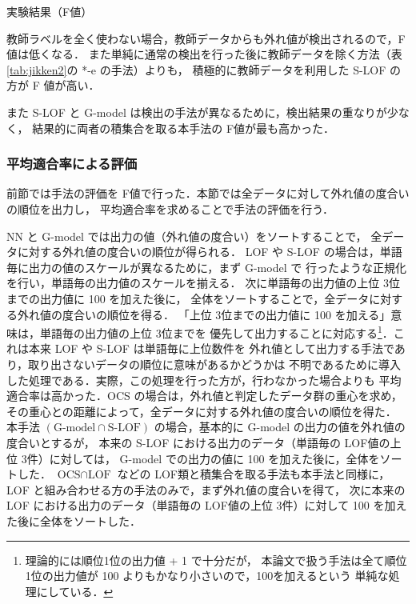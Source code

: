 \documentclass[japanese]{jnlp_1.4}
\begin{document}
\begin{table}[t]
\caption{実験結果（F値）}
\label{tab:jikken2}

\end{table}

教師ラベルを全く使わない場合，教師データからも外れ値が検出されるので，F値は低くなる．
また単純に通常の検出を行った後に教師データを除く方法（表\ref{tab:jikken2}の *-e の手法）よりも，
積極的に教師データを利用した S-LOF の方が F 値が高い．

また S-LOF と G-model は検出の手法が異なるために，検出結果の重なりが少なく，
結果的に両者の積集合を取る本手法の F値が最も高かった．

\subsubsection{平均適合率による評価} 

前節では手法の評価を F値で行った．本節では全データに対して外れ値の度合いの順位を出力し，
平均適合率を求めることで手法の評価を行う．

NN と G-model では出力の値（外れ値の度合い）をソートすることで，
全データに対する外れ値の度合いの順位が得られる．
LOF や S-LOF の場合は，単語毎に出力の値のスケールが異なるために，まず G-model で
行ったような正規化を行い，単語毎の出力値のスケールを揃える．
次に単語毎の出力値の上位 3位までの出力値に 100 を加えた後に，
全体をソートすることで，全データに対する外れ値の度合いの順位を得る．
「上位 3位までの出力値に 100 を加える」意味は，単語毎の出力値の上位 3位までを
優先して出力することに対応する\footnote{理論的には順位1位の出力値 + 1 で十分だが，
本論文で扱う手法は全て順位1位の出力値が 100 よりもかなり小さいので，100を加えるという
単純な処理にしている．}．これは本来 LOF や S-LOF は単語毎に上位数件を
外れ値として出力する手法であり，取り出さないデータの順位に意味があるかどうかは
不明であるために導入した処理である．実際，この処理を行った方が，行わなかった場合よりも
平均適合率は高かった．OCS の場合は，外れ値と判定したデータ群の重心を求め，
その重心との距離によって，全データに対する外れ値の度合いの順位を得た．
本手法 $(\text{G-model}\cap\text{S-LOF})$ の場合，基本的に G-model の出力の値を外れ値の度合いとするが，
本来の S-LOF における出力のデータ（単語毎の LOF値の上位 3件）に対しては，
G-model での出力の値に 100 を加えた後に，全体をソートした．
$\text{OCS}\cap\text{LOF}$ などの LOF類と積集合を取る手法も本手法と同様に，
LOF と組み合わせる方の手法のみで，まず外れ値の度合いを得て，
次に本来の LOF における出力のデータ（単語毎の LOF値の上位 3件）に対して 100 を加えた後に全体をソートした．
\end{document}
